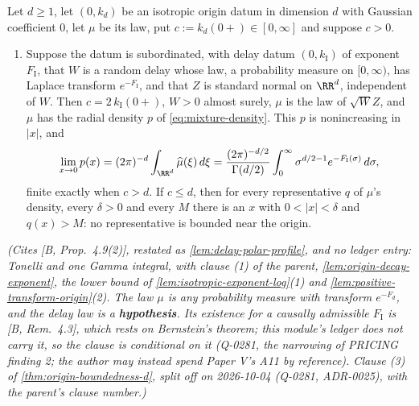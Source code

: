 \begin{proposition}
\label{prop:origin-boundedness-subordinated}
\leanok
Let $d \ge 1$, let $(0, k_d)$ be an isotropic origin datum in dimension $d$ with Gaussian
coefficient $0$, let $\mu$ be its law, put $c := k_d(0{+}) \in [0,\infty]$ and suppose $c > 0$.
\begin{enumerate}
\item[(3)] Suppose the datum is subordinated, with delay datum $(0,k_{\mathrm I})$ of exponent
$F_{\mathrm I}$, that $W$ is a random delay whose law, a probability measure on $[0,\infty)$, has
Laplace transform $e^{-F_{\mathrm I}}$, and that $Z$ is standard normal on $\RR^d$, independent of
$W$. Then $c = 2\,k_{\mathrm I}(0{+})$, $W > 0$ almost surely, $\mu$ is the law of $\sqrt{W}Z$, and
$\mu$ has the radial density $p$ of \ref{eq:mixture-density}. This $p$ is nonincreasing in $|x|$, and
\[
  \lim_{x \to 0} p(x) = (2\pi)^{-d}\int_{\RR^d}\widehat\mu(\xi)\,d\xi
   = \frac{(2\pi)^{-d/2}}{\Gamma(d/2)}\int_0^\infty \sigma^{d/2-1}e^{-F_{\mathrm I}(\sigma)}\,d\sigma ,
\]
finite exactly when $c > d$. If $c \le d$, then for every representative $q$ of $\mu$'s
density, every $\delta > 0$ and every $M$ there is an $x$ with $0 < |x| < \delta$ and
$q(x) > M$: no representative is bounded near the origin.
\end{enumerate}
\statusT\quad\emph{(Cites [B, Prop.~4.9(2)], restated as \ref{lem:delay-polar-profile}, and no
ledger entry: Tonelli and one Gamma integral, with clause (1) of the parent,
\ref{lem:origin-decay-exponent}, the lower bound of \ref{lem:isotropic-exponent-log}(1) and
\ref{lem:positive-transform-origin}(2). The law $\mu$ is
any probability measure with transform $e^{-F_d}$, and the delay law is a \textbf{hypothesis}. Its
existence for a causally admissible $F_{\mathrm I}$ is [B, Rem.~4.3], which rests on Bernstein's
theorem; this module's ledger does not carry it, so the clause is conditional on it (Q-0281, the
narrowing of PRICING finding 2; the author may instead spend Paper V's A11 by reference). Clause (3)
of \ref{thm:origin-boundedness-d}, split off on 2026-10-04 (Q-0281, ADR-0025), with the parent's
clause number.)}
\end{proposition}

